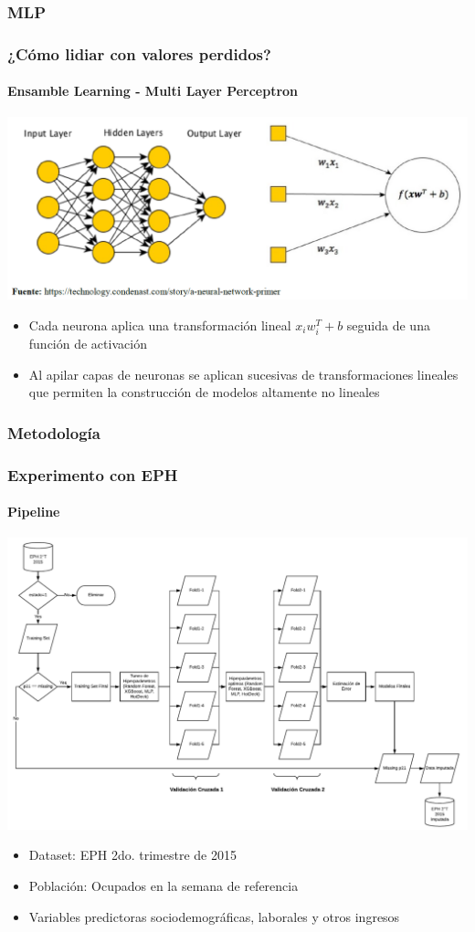 \documentclass{beamer}
\begin{document}
\subsubsection{MLP}

\begin{frame}
\frametitle{¿Cómo lidiar con valores perdidos?}
\framesubtitle{Ensamble Learning - Multi Layer Perceptron}
\includegraphics[width=1\linewidth, height=0.5\textheight]{../img/mlp}
\begin{itemize}		
	\item Cada neurona aplica una transformación lineal  $x_{i}w_{i}^T+b$ seguida de una función de activación
	\item Al apilar capas de neuronas se aplican sucesivas de transformaciones lineales que permiten la construcción de modelos altamente no lineales
\end{itemize}
\end{frame}

\subsubsection{Metodología}
\begin{frame}
\frametitle{Experimento con EPH}
\framesubtitle{Pipeline}
\includegraphics[width=0.99\linewidth, height=0.6\textheight]{../img/pipeline}
\begin{itemize}
	\item Dataset: EPH 2do. trimestre de 2015
	\item Población: Ocupados en la semana de referencia
	\item Variables predictoras sociodemográficas, laborales y otros ingresos
\end{itemize}
\end{frame}
\end{document}
